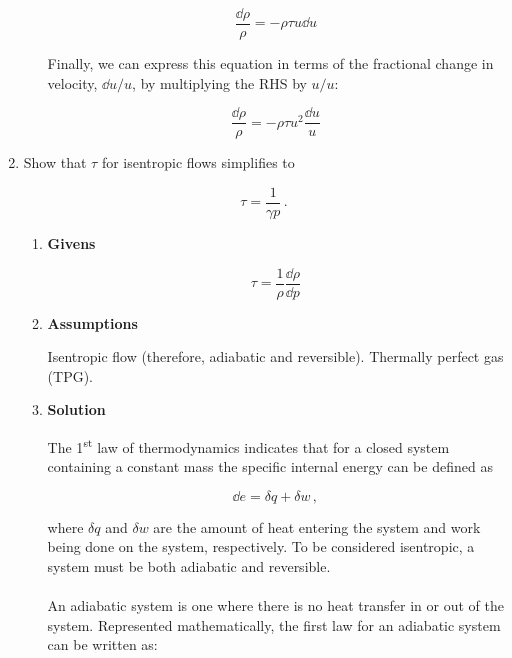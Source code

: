 \documentclass[12pt,letterpaper]{article}
\begin{document}
\begin{enumerate}[label=(\alph*)]
\begin{enumerate}[label=\arabic*.]
			
			
			\begin{equation*}
				\frac{\dd \rho}{\rho} = - \rho \tau u \dd u
			\end{equation*}
			
			Finally, we can express this equation in terms of the fractional change in velocity, $\dd u / u$, by multiplying the RHS by $u / u$:
			
			\begin{equation*}
					\boxed{\frac{\dd \rho}{\rho} = - \rho \tau u^2 \frac{\dd u}{u}}
			\end{equation*} 
		\end{enumerate}
		
		\item Show that $\tau$ for isentropic flows simplifies to
		
			\begin{equation*}
				\tau = \frac{1}{\gamma p} \,.
			\end{equation*}
	
			\begin{enumerate}[label=\arabic*.]
	
				\item{\textbf{Givens}} \\
					\begin{equation*}
						\tau = \frac{1}{\rho} \frac{\dd \rho}{\dd p}
					\end{equation*}
				
				\item{\textbf{Assumptions}} \\
					Isentropic flow (therefore, adiabatic and reversible). Thermally perfect gas (TPG).
					
				\item{\textbf{Solution}} \\
					The 1\textsuperscript{st} law of thermodynamics indicates that for a closed system containing a constant mass the specific internal energy can be defined as
					
					\begin{equation*}
						\dd e = \delta q + \delta w\,,
					\end{equation*}

					where $\delta q$ and $\delta w$ are the amount of heat entering the system and work being done on the system, respectively. To be considered isentropic, a system must be both adiabatic and reversible.\\
					\medskip
					\\
					An adiabatic system is one where there is no heat transfer in or out of the system. Represented mathematically, the first law for an adiabatic system can be written as:


\end{enumerate}
\end{enumerate}
\end{document}
